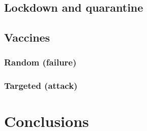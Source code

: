 \documentclass[DIV=12, BCOR=0pt]{scrartcl}  %
\begin{document}
  \subsection{Lockdown and quarantine}
  \subsection{Vaccines}
  \subsubsection{Random (failure)}
	\subsubsection{Targeted (attack)}

	\section{Conclusions}

		
  \footnotesize
	
\end{document}
